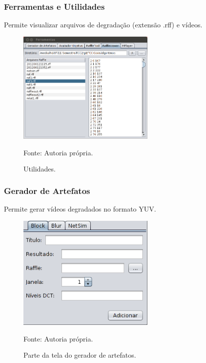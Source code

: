         \begin{frame}\frametitle{Ferramentas e Utilidades}
            Permite visualizar arquivos de degradação (extensão .rff) e vídeos.
		    \begin{figure}
			    \includegraphics[width=0.6\textwidth]{./imgs/ferramentas-viewer.png}
			    \caption{Utilidades.}
			    \tiny
			    Fonte: Autoria própria.
		    \end{figure}
        \end{frame}
        
        \begin{frame}\frametitle{Gerador de Artefatos}
            Permite gerar vídeos degradados no formato YUV.
		    \begin{figure}
			    \includegraphics[width=0.6\textwidth]{./imgs/ferramentas-gerador.png}
			    \caption{Parte da tela do gerador de artefatos.}
			    \tiny
			    Fonte: Autoria própria.
		    \end{figure}
        \end{frame}
        
